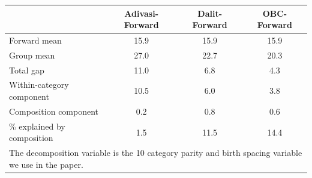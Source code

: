 \begin{tabular}{l*{3}{c}}
\hline\hline
            &\multicolumn{1}{c}{Adivasi-Forward}&\multicolumn{1}{c}{Dalit-Forward}&\multicolumn{1}{c}{OBC-Forward}\\
\hline
\hline
Forward mean&        15.9&        15.9&        15.9\\
Group mean  &        27.0&        22.7&        20.3\\
Total gap   &        11.0&         6.8&         4.3\\
Within-category component&        10.5&         6.0&         3.8\\
Composition component&         0.2&         0.8&         0.6\\
\% explained by composition&         1.5&        11.5&        14.4\\
\hline\hline
\multicolumn{4}{l}{\footnotesize \parbox[t]{0.95\linewidth}{The decomposition variable is the 10 category parity and birth spacing variable we use in the paper.}}\\
\end{tabular}
